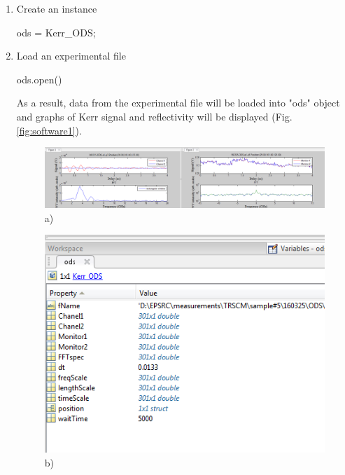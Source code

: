 \documentclass[14pt,a4paper] {article}
\begin{document}
\begin{enumerate}
\item Create an instance

    ods = Kerr_ODS;
    
\item Load an experimental file
   
    ods.open()
    
As a result, data from the experimental file will be loaded into "ods" object and graphs of Kerr signal and reflectivity will be displayed (Fig. \ref{fig:software1}).

\begin{figure}
\begin{minipage}{1\linewidth}
\includegraphics[width = 1\linewidth]{software1} \\a)
\end{minipage}
\vfill
\begin{minipage}{0.5\linewidth}
\includegraphics[width = 1\linewidth]{software2} \\b)
\end{minipage}
\begin{minipage}{0.5\linewidth}

\end{minipage}
\end{figure}
\end{enumerate}
\end{document}
